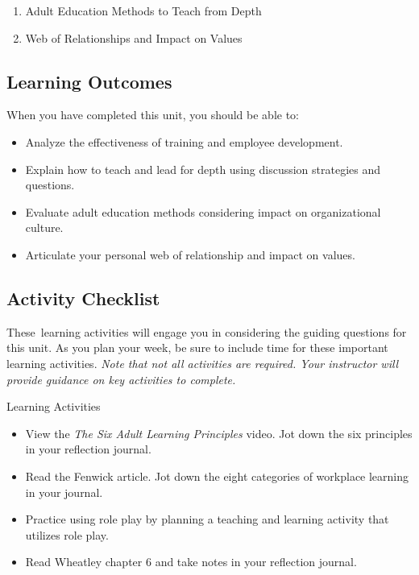 \documentclass[
]{book}
\providecommand{\tightlist}{%
  \setlength{\itemsep}{0pt}\setlength{\parskip}{0pt}}
\begin{document}
\begin{enumerate}
\def\labelenumi{\arabic{enumi}.}
\tightlist
\item
  Adult Education Methods to Teach from Depth\\
\item
  Web of Relationships and Impact on Values
\end{enumerate}

\hypertarget{learning-outcomes-7}{%
\subsection*{Learning Outcomes}\label{learning-outcomes-7}}

When you have completed this unit, you should be able to:

\begin{itemize}
\tightlist
\item
  Analyze the effectiveness of training and employee development.\\
\item
  Explain how to teach and lead for depth using discussion strategies and questions.\\
\item
  Evaluate adult education methods considering impact on organizational culture.\\
\item
  Articulate your personal web of relationship and impact on values.
\end{itemize}

\hypertarget{activity-checklist-7}{%
\subsection*{Activity Checklist}\label{activity-checklist-7}}

These~learning activities will engage you in considering the guiding questions for this unit. As you plan your week, be sure to include time for these important learning activities. \emph{Note that not all activities are required. Your instructor will provide guidance on key activities to complete.}

\begin{reflect}
{Learning Activities}

\begin{itemize}
\tightlist
\item
  View the \emph{The Six Adult Learning Principles} video. Jot down the
  six principles in your reflection journal.\\
\item
  Read the Fenwick article. Jot down the eight categories of workplace
  learning in your journal.\\
\item
  Practice using role play by planning a teaching and learning activity
  that utilizes role play.\\
\item
  Read Wheatley chapter 6 and take notes in your reflection journal.
\end{itemize}
\end{reflect}
\end{document}

